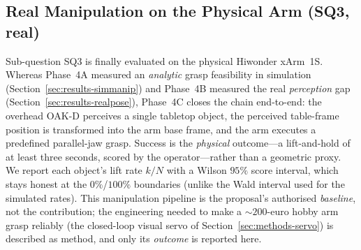 %
%


\subsection{Real Manipulation on the Physical Arm (SQ3, real)}
\label{sec:results-realmanip}

Sub-question SQ3 is finally evaluated on the physical Hiwonder xArm~1S.
Whereas Phase~4A measured an \emph{analytic} grasp feasibility in simulation
(Section~\ref{sec:results-simmanip}) and Phase~4B measured the real
\emph{perception} gap (Section~\ref{sec:results-realpose}), Phase~4C closes the
chain end-to-end: the overhead OAK-D perceives a single tabletop object, the
perceived table-frame position is transformed into the arm base frame, and the
arm executes a predefined parallel-jaw grasp. Success is the \emph{physical}
outcome---a lift-and-hold of at least three seconds, scored by the
operator---rather than a geometric proxy. We report each object's lift rate
$k/N$ with a Wilson $95\%$ score interval, which stays honest at the
$0\%$/$100\%$ boundaries (unlike the Wald interval used for the simulated
rates). This manipulation pipeline is the proposal's authorised \emph{baseline},
not the contribution; the engineering needed to make a ${\sim}200$-euro
hobby arm grasp reliably (the closed-loop visual servo of
Section~\ref{sec:methods-servo}) is described as method, and only its
\emph{outcome} is reported here.

